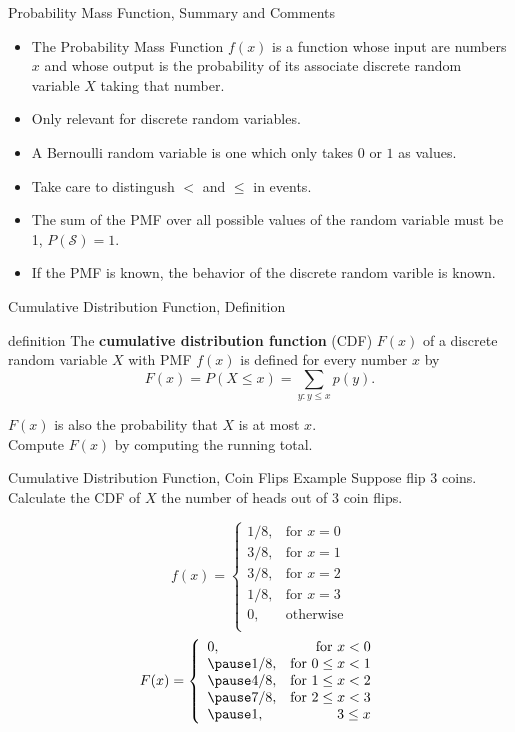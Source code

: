 \documentclass[handout]{beamer}
\newcommand{\nl}[1]{\vspace{#1 em}}
\begin{document}
\begin{frame}{Probability Mass Function, Summary and Comments}
    \begin{itemize}
        \item The Probability Mass Function $f(x)$ is a function whose input are numbers $x$ and whose output is the probability of its associate discrete random variable $X$ taking that number.
        \item Only relevant for discrete random variables.
        \item A Bernoulli random variable is one which only takes $0$ or $1$ as values.
        \item Take care to distingush $<$ and $\leq$ in events.
        \item The sum of the PMF over all possible values of the random variable must be 1, $P(\mathcal{S})=1$.
        \item If the PMF is known, the behavior of the discrete random varible is known.
    \end{itemize}
\end{frame}

\begin{frame}{Cumulative Distribution Function, Definition}
    \begin{block}{definition}
    The \textbf{cumulative distribution function} (CDF) $F(x)$ of a discrete random variable $X$ with PMF $f(x)$ is defined for every number $x$ by
    $$F(x) = P(X \leq x) = \sum_{y:y\leq x} p(y).$$
    \end{block}
    $F(x)$ is also the probability that $X$ is at most $x$. \\ \nl{0.5}
    Compute $F(x)$ by computing the running total. 
\end{frame}

\begin{frame}{Cumulative Distribution Function, Coin Flips Example}
        Suppose flip 3 coins. Calculate the CDF of $X$ the number of heads out of 3 coin flips.
        
    $$
    f(x)= \left\{\begin{array}{lr}
        1/8, & \text{for } x = 0\\
        3/8, & \text{for } x = 1\\
        3/8, & \text{for } x = 2\\
        1/8, & \text{for } x = 3\\
        0, & \text{otherwise}\\
        \end{array}\right.$$
        \pause$$
    F(x)= \left\{\begin{array}{lr}
        0, & \text{for } x < 0\\
        \pause 1/8, & \text{for } 0 \leq x < 1\\
        \pause 4/8, & \text{for } 1 \leq x < 2\\
        \pause 7/8, & \text{for } 2 \leq x < 3\\
        \pause 1, & 3\leq x\\
        \end{array}\right.$$
    \end{frame}
\end{document}
